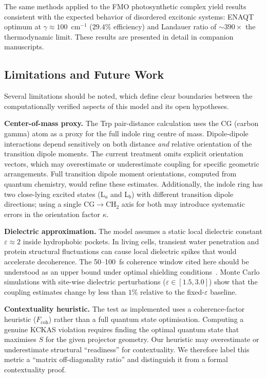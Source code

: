 \documentclass[aps,pre,twocolumn,showpacs,superscriptaddress]{revtex4-2}
\begin{document}
The same methods applied to the FMO photosynthetic complex yield results consistent with the expected behavior of disordered excitonic systems: ENAQT optimum at $\gamma \approx 100$~cm$^{-1}$ ($29.4\%$ efficiency) and Landauer ratio of $\sim 390\times$ the thermodynamic limit. These results are presented in detail in companion manuscripts.

\subsection{Limitations and Future Work}

Several limitations should be noted, which define clear boundaries between the computationally verified aspects of this model and its open hypotheses.

\textbf{Center-of-mass proxy.} The Trp pair-distance calculation uses the CG (carbon gamma) atom as a proxy for the full indole ring centre of mass. Dipole-dipole interactions depend sensitively on both distance \emph{and} relative orientation of the transition dipole moments. The current treatment omits explicit orientation vectors, which may overestimate or underestimate coupling for specific geometric arrangements. Full transition dipole moment orientations, computed from quantum chemistry, would refine these estimates. Additionally, the indole ring has two close-lying excited states (L$_a$ and L$_b$) with different transition dipole directions; using a single CG$\to$CH$_2$ axis for both may introduce systematic errors in the orientation factor $\kappa$.

\textbf{Dielectric approximation.} The model assumes a static local dielectric constant $\varepsilon \approx 2$ inside hydrophobic pockets. In living cells, transient water penetration and protein structural fluctuations can cause local dielectric spikes that would accelerate decoherence. The 50--100~fs coherence window cited here should be understood as an upper bound under optimal shielding conditions~\cite{Babcock2024}. Monte Carlo simulations with site-wise dielectric perturbations ($\varepsilon \in [1.5, 3.0]$) show that the coupling estimates change by less than $1\%$ relative to the fixed-$\varepsilon$ baseline.

\textbf{Contextuality heuristic.} The test as implemented uses a coherence-factor heuristic ($F_{\mathrm{coh}}$) rather than a full quantum state optimisation. Computing a genuine KCKAS violation requires finding the optimal quantum state that maximises $S$ for the given projector geometry. Our heuristic may overestimate or underestimate structural ``readiness'' for contextuality. We therefore label this metric a ``matrix off-diagonality ratio'' and distinguish it from a formal contextuality proof.
\end{document}
